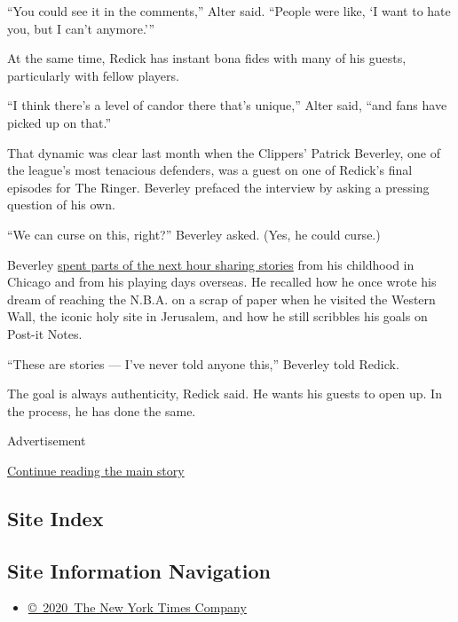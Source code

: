 ``You could see it in the comments,'' Alter said. ``People were like, `I
want to hate you, but I can't anymore.'''

At the same time, Redick has instant bona fides with many of his guests,
particularly with fellow players.

``I think there's a level of candor there that's unique,'' Alter said,
``and fans have picked up on that.''

That dynamic was clear last month when the Clippers' Patrick Beverley,
one of the league's most tenacious defenders, was a guest on one of
Redick's final episodes for The Ringer. Beverley prefaced the interview
by asking a pressing question of his own.

``We can curse on this, right?'' Beverley asked. (Yes, he could curse.)

Beverley
\href{https://www.theringer.com/2020/7/16/21327810/patrick-beverley-on-doubt-setting-goals-and-developing-his-game}{spent
parts of the next hour sharing stories} from his childhood in Chicago
and from his playing days overseas. He recalled how he once wrote his
dream of reaching the N.B.A. on a scrap of paper when he visited the
Western Wall, the iconic holy site in Jerusalem, and how he still
scribbles his goals on Post-it Notes.

``These are stories --- I've never told anyone this,'' Beverley told
Redick.

The goal is always authenticity, Redick said. He wants his guests to
open up. In the process, he has done the same.

Advertisement

\protect\hyperlink{after-bottom}{Continue reading the main story}

\hypertarget{site-index}{%
\subsection{Site Index}\label{site-index}}

\hypertarget{site-information-navigation}{%
\subsection{Site Information
Navigation}\label{site-information-navigation}}

\begin{itemize}
\tightlist
\item
  \href{https://help.nytimes3xbfgragh.onion/hc/en-us/articles/115014792127-Copyright-notice}{©~2020~The
  New York Times Company}
\end{itemize}

